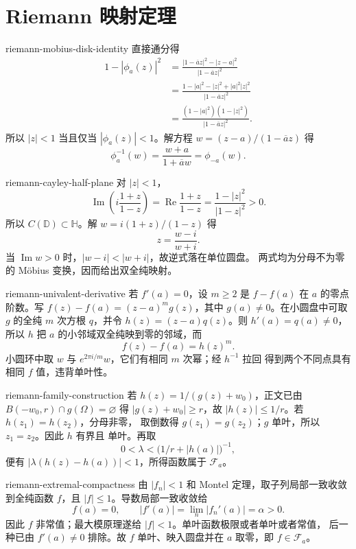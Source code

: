 \chapter{Riemann 映射定理}

\begin{solution}{riemann-mobius-disk-identity}
直接通分得
\begin{align*}
 1-|\phi_a(z)|^2
 &=\frac{|1-\overline a z|^2-|z-a|^2}{|1-\overline a z|^2}\\
 &=\frac{1-|a|^2-|z|^2+|a|^2|z|^2}{|1-\overline a z|^2}\\
 &=\frac{(1-|a|^2)(1-|z|^2)}{|1-\overline a z|^2}.
\end{align*}
所以 $|z|<1$ 当且仅当 $|\phi_a(z)|<1$。解方程
$w=(z-a)/(1-\overline a z)$ 得
\[
 \phi_a^{-1}(w)=\frac{w+a}{1+\overline a w}=\phi_{-a}(w).
\]
\end{solution}

\begin{solution}{riemann-cayley-half-plane}
对 $|z|<1$，
\[
 \operatorname{Im}\left(i\frac{1+z}{1-z}\right)
 =\operatorname{Re}\frac{1+z}{1-z}
 =\frac{1-|z|^2}{|1-z|^2}>0.
\]
所以 $C(\mathbb D)\subset\mathbb H$。解 $w=i(1+z)/(1-z)$ 得
\[
 z=\frac{w-i}{w+i}.
\]
当 $\operatorname{Im}w>0$ 时，$|w-i|<|w+i|$，故逆式落在单位圆盘。
两式均为分母不为零的 M\"obius 变换，因而给出双全纯映射。
\end{solution}

\begin{solution}{riemann-univalent-derivative}
若 $f'(a)=0$，设 $m\ge2$ 是 $f-f(a)$ 在 $a$ 的零点阶数。写
$f(z)-f(a)=(z-a)^mg(z)$，其中 $g(a)\ne0$。在小圆盘中可取 $g$ 的全纯
$m$ 次方根 $q$，并令 $h(z)=(z-a)q(z)$。则 $h'(a)=q(a)\ne0$，所以 $h$
把 $a$ 的小邻域双全纯映到零的邻域，而
\[
 f(z)-f(a)=h(z)^m.
\]
小圆环中取 $w$ 与 $e^{2\pi i/m}w$，它们有相同 $m$ 次幂；经 $h^{-1}$ 拉回
得到两个不同点具有相同 $f$ 值，违背单叶性。
\end{solution}

\begin{solution}{riemann-family-construction}
若 $h(z)=1/(g(z)+w_0)$，正文已由
$B(-w_0,r)\cap g(\Omega)=\varnothing$ 得
$|g(z)+w_0|\ge r$，故 $|h(z)|\le1/r$。若 $h(z_1)=h(z_2)$，分母非零，
取倒数得 $g(z_1)=g(z_2)$；$g$ 单叶，所以 $z_1=z_2$。因此 $h$ 有界且
单叶。再取
\[
 0<\lambda<\bigl(1/r+|h(a)|\bigr)^{-1},
\]
便有 $|\lambda(h(z)-h(a))|<1$，所得函数属于 $\mathcal F_a$。
\end{solution}

\begin{solution}{riemann-extremal-compactness}
由 $|f_n|<1$ 和 Montel 定理，取子列局部一致收敛到全纯函数 $f$，且
$|f|\le1$。导数局部一致收敛给
\[
 f(a)=0,\qquad |f'(a)|=\lim_n|f_n'(a)|=\alpha>0.
\]
因此 $f$ 非常值；最大模原理遂给 $|f|<1$。单叶函数极限或者单叶或者常值，
后一种已由 $f'(a)\ne0$ 排除。故 $f$ 单叶、映入圆盘并在 $a$ 取零，即
$f\in\mathcal F_a$。
\end{solution}

